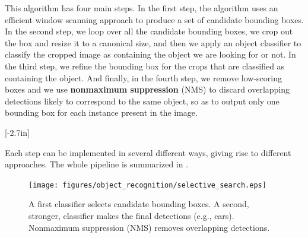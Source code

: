 This algorithm has four main steps. In the first step, the algorithm uses an efficient window scanning approach to produce a set of candidate bounding boxes. In the second step, we loop over all the candidate bounding boxes, we crop out the box and resize it to a canonical size, and then we apply an object classifier to classify the cropped image as containing the object we are looking for or not. In the third step, we refine the bounding box for the crops that are classified as containing the object. And finally, in the fourth step, we remove low-scoring boxes and we use {\bf nonmaximum suppression} (NMS) to discard overlapping detections likely to correspond to the same object, so as to output only one bounding box for each instance present in the image. 

[-2.7in]

Each step can be implemented in several different ways, giving rise to different approaches. The whole pipeline is summarized in \fig{\ref{fig:selective_search_pipeline}}.


\begin{figure}[t]
\centerline{
\texttt{[image: figures/object\_recognition/selective\_search.eps]}
}
\caption{A first classifier selects candidate bounding boxes. A second, stronger, classifier makes the final detections (e.g., cars). Nonmaximum suppression (NMS) removes overlapping detections.}
\label{fig:selective_search_pipeline}
\end{figure}

